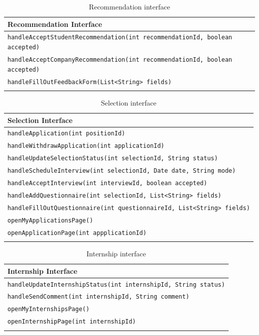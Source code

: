 \renewcommand{\arraystretch}{1.5}
\begin{longtable}{|p{14.5cm}|}
    \hline
    \cellcolor{customgreen}\textbf{Recommendation Interface} \\ \hline
    \texttt{handleAcceptStudentRecommendation(int recommendationId, boolean accepted)} \\ \hline
    \texttt{handleAcceptCompanyRecommendation(int recommendationId, boolean accepted)} \\ \hline
    \texttt{handleFillOutFeedbackForm(List<String> fields)} \\ \hline
\caption{Recommendation interface}
\end{longtable}

\renewcommand{\arraystretch}{1.5}
\begin{longtable}{|p{14.5cm}|}
    \hline
    \cellcolor{customyellow}\textbf{Selection Interface} \\ \hline
    \texttt{handleApplication(int positionId)} \\ \hline
    \texttt{handleWithdrawApplication(int applicationId)} \\ \hline
    \texttt{handleUpdateSelectionStatus(int selectionId, String status)} \\ \hline
    \texttt{handleScheduleInterview(int selectionId, Date date, String mode)} \\ \hline
    \texttt{handleAcceptInterview(int interviewId, boolean accepted)} \\ \hline
    \texttt{handleAddQuestionnaire(int selectionId, List<String> fields)} \\ \hline
    \texttt{handleFillOutQuestionnaire(int questionnaireId, List<String> fields)} \\ \hline
    \texttt{openMyApplicationsPage()} \\ \hline
    \texttt{openApplicationPage(int appplicationId)} \\ \hline
\caption{Selection interface}
\end{longtable}

\renewcommand{\arraystretch}{1.5}
\begin{longtable}{|p{14.5cm}|}
    \hline
    \cellcolor{customorange}\textbf{Internship Interface} \\ \hline
    \texttt{handleUpdateInternshipStatus(int internshipId, String status)} \\ \hline
    \texttt{handleSendComment(int internshipId, String comment)} \\ \hline
    \texttt{openMyInternshipsPage()} \\ \hline
    \texttt{openInternshipPage(int internshipId)} \\ \hline
\caption{Internship interface}
\end{longtable}


